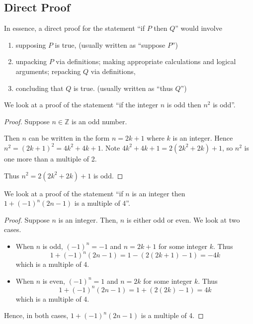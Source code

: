 \subsection{Direct Proof}
In essence, a direct proof for the statement ``if $P$ then $Q$'' would involve
\begin{enumerate}
    \item supposing $P$ is true, (usually written as ``suppose $P$'')
    \item unpacking $P$ via definitions; making appropriate calculations and logical arguments; repacking $Q$ via definitions,
    \item concluding that $Q$ is true. (usually written as ``thus $Q$'')
\end{enumerate}
\begin{example}
    We look at a proof of the statement ``if the integer $n$ is odd then $n^2$ is odd''.
    \begin{proof}
        Suppose $n\in\mathbb{Z}$ is an odd number.
        
        Then $n$ can be written in the form $n = 2k + 1$ where $k$ is an integer. Hence $n^2 = (2k+1)^2 = 4k^2 + 4k + 1$. Note $4k^2 + 4k + 1 = 2(2k^2 + 2k) + 1$, so $n^2$ is one more than a multiple of 2.
        
        Thus $n^2 = 2(2k^2 + 2k) + 1$ is odd.
    \end{proof}
\end{example}

\begin{example}
    We look at a proof of the statement ``if $n$ is an integer then $1 + (-1)^n(2n-1)$ is a multiple of 4''.
    \begin{proof}
        Suppose $n$ is an integer. Then, $n$ is either odd or even. We look at two cases.
        \begin{itemize}
            \item When $n$ is odd, $(-1)^n = -1$ and $n = 2k+1$ for some integer $k$. Thus
            \[
                1 + (-1)^n(2n-1) = 1 - (2(2k+1)-1) = -4k
            \]
            which is a multiple of 4.
            \item When $n$ is even, $(-1)^n = 1$ and $n = 2k$ for some integer $k$. Thus
            \[
                1 + (-1)^n(2n-1) = 1 + (2(2k)-1) = 4k
            \]
            which is a multiple of 4.
        \end{itemize}
        Hence, in both cases, $1 + (-1)^n(2n-1)$ is a multiple of 4.
    \end{proof}
\end{example}

